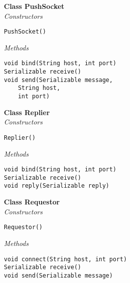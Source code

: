 \documentclass[11pt,journal,compsoc]{IEEEtran}
\begin{document}
\textbf{Class PushSocket}
\\
\emph{Constructors}
\begin{lstlisting}
PushSocket() 
\end{lstlisting}
\emph{Methods}
\begin{lstlisting}
void bind(String host, int port)
Serializable receive() 
void send(Serializable message, 
    String host, 
    int port) 

\end{lstlisting}
\textbf{Class Replier}
\\
\emph{Constructors}
\begin{lstlisting}
Replier() 
\end{lstlisting}
\emph{Methods}
\begin{lstlisting}
void bind(String host, int port)
Serializable receive() 
void reply(Serializable reply) 

\end{lstlisting}
\textbf{Class Requestor}
\\
\emph{Constructors}
\begin{lstlisting}
Requestor() 
\end{lstlisting}
\emph{Methods}
\begin{lstlisting}
void connect(String host, int port) 
Serializable receive() 
void send(Serializable message) 

\end{lstlisting}





\ifCLASSOPTIONcaptionsoff
  \newpage
\fi




\end{document}
